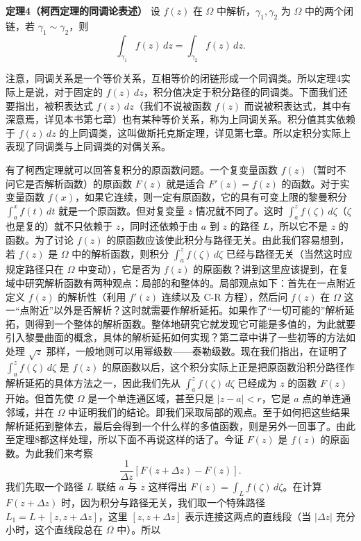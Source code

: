 \noindent\textbf{定理4（柯西定理的同调论表述）}
设 $f(z)$ 在 $\Omega$ 中解析，$\gamma_1,\gamma_2$ 为 $\Omega$ 中的两个闭链，若 $\gamma_1\sim\gamma_2$，则
\[
 \int_{\gamma_1}f(z)\,dz=\int_{\gamma_2}f(z)\,dz.
\]

注意，同调关系是一个等价关系，互相等价的闭链形成一个同调类。所以定理4实际上是说，对于固定的 $f(z)\,dz$，积分值决定于积分路径的同调类。下面我们还要指出，被积表达式 $f(z)\,dz$（我们不说被函数 $f(z)$ 而说被积表达式，其中有深意焉，详见本书第七章）也有某种等价关系，称为上同调关系。积分值其实依赖于 $f(z)\,dz$ 的上同调类，这叫做斯托克斯定理，详见第七章。所以定积分实际上表现了同调类与上同调类的对偶关系。

有了柯西定理就可以回答复积分的原函数问题。一个复变量函数 $f(z)$（暂时不问它是否解析函数）的原函数 $F(z)$ 就是适合 $F'(z)=f(z)$ 的函数。对于实变量函数 $f(x)$，如果它连续，则一定有原函数，它的具有可变上限的黎曼积分 $\int_a^x f(t)\,dt$ 就是一个原函数。但对复变量 $z$ 情况就不同了。这时 $\int_a^z f(\zeta)\,d\zeta$（$\zeta$ 也是复的）就不只依赖于 $z$，同时还依赖于由 $a$ 到 $z$ 的路径 $L$，所以它不是 $z$ 的函数。为了讨论 $f(z)$ 的原函数应该使此积分与路径无关。由此我们容易想到，若 $f(z)$ 是 $\Omega$ 中的解析函数，则积分 $\int_a^z f(\zeta)\,d\zeta$ 已经与路径无关（当然这时应规定路径只在 $\Omega$ 中变动），它是否为 $f(z)$ 的原函数？讲到这里应该提到，在复域中研究解析函数有两种观点：局部的和整体的。局部观点如下：首先在一点附近定义 $f(z)$ 的解析性（利用 $f'(z)$ 连续以及 C-R 方程），然后问 $f(z)$ 在 $\Omega$ 这一“点附近”以外是否解析？这时就需要作解析延拓。如果作了“一切可能的”解析延拓，则得到一个整体的解析函数。整体地研究它就发现它可能是多值的，为此就要引入黎曼曲面的概念，具体的解析延拓如何实现？第二章中讲了一些初等的方法如处理 $\sqrt z$ 那样，一般地则可以用幂级数——泰勒级数。现在我们指出，在证明了 $\int_a^z f(\zeta)\,d\zeta$ 是 $f(z)$ 的原函数以后，这个积分实际上正是把原函数沿积分路径作解析延拓的具体方法之一，因此我们先从 $\int_a^z f(\zeta)\,d\zeta$ 已经成为 $z$ 的函数 $F(z)$ 开始。但首先使 $\Omega$ 是一个单连通区域，甚至只是 $|z-a|<r$，它是 $a$ 点的单连通邻域，并在 $\Omega$ 中证明我们的结论。即我们采取局部的观点。至于如何把这些结果解析延拓到整体去，最后会得到一个什么样的多值函数，则是另外一回事了。由此至定理8都这样处理，所以下面不再说这样的话了。今证 $F(z)$ 是 $f(z)$ 的原函数。为此我们来考察
\[
 \frac1{\Delta z}[F(z+\Delta z)-F(z)].
\]
我们先取一个路径 $L$ 联结 $a$ 与 $z$ 这样得出 $F(z)=\int_Lf(\zeta)\,d\zeta$。在计算 $F(z+\Delta z)$ 时，因为积分与路径无关，我们取一个特殊路径 $L_1=L+[z,z+\Delta z]$，这里 $[z,z+\Delta z]$ 表示连接这两点的直线段（当 $|\Delta z|$ 充分小时，这个直线段总在 $\Omega$ 中）。所以
